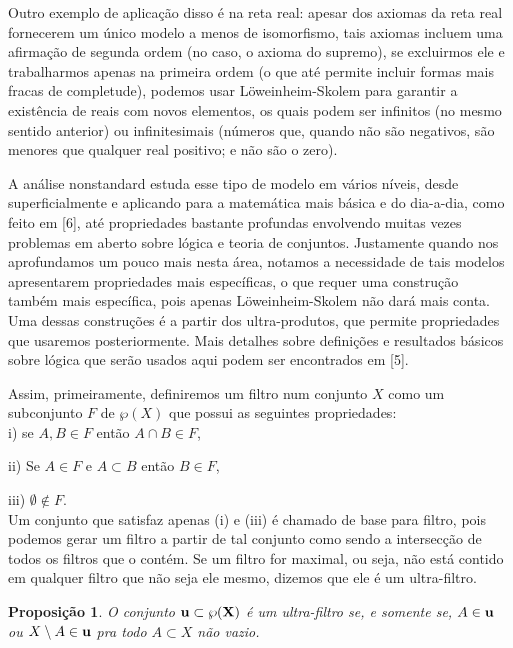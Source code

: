 \documentclass[12pt,a4paper]{article}
\newtheorem{prop}[mydef]{Proposição}
\theoremstyle{definition}
\begin{document}
Outro exemplo de aplicação disso é na reta real: apesar dos axiomas da reta real fornecerem um único modelo a menos de isomorfismo, tais axiomas incluem uma afirmação de segunda ordem (no caso, o axioma do supremo), se excluirmos ele e trabalharmos apenas na primeira ordem (o que até permite incluir formas mais fracas de completude), podemos usar Löweinheim-Skolem para garantir a existência de reais com novos elementos, os quais podem ser infinitos (no mesmo sentido anterior) ou infinitesimais (números que, quando não são negativos, são menores que qualquer real positivo; e não são o zero).

A análise nonstandard estuda esse tipo de modelo em vários níveis, desde superficialmente e aplicando para a matemática mais básica e do dia-a-dia, como feito em [6], até propriedades bastante profundas envolvendo muitas vezes problemas em aberto sobre lógica e teoria de conjuntos. Justamente quando nos aprofundamos um pouco mais nesta área, notamos a necessidade de tais modelos apresentarem propriedades mais específicas, o que requer uma construção também mais específica, pois apenas Löweinheim-Skolem não dará mais conta. Uma dessas construções é a partir dos ultra-produtos, que permite propriedades que usaremos posteriormente. Mais detalhes sobre definições e resultados básicos sobre lógica que serão usados aqui podem ser encontrados em [5].

Assim, primeiramente, definiremos um filtro num conjunto $X$ como um subconjunto $F$ de $\wp (X)$ que possui as seguintes propriedades: \\
	
	i) se $A,B\in F$ então $A\cap B\in F$,
	
	ii) Se $A\in F$ e $A\subset B$ então $B\in F$,
	
	iii) $\emptyset \notin F$. \\

Um conjunto que satisfaz apenas (i) e (iii) é chamado de base para filtro, pois podemos gerar um filtro a partir de tal conjunto como sendo a intersecção de todos os filtros que o contém. Se um filtro for maximal, ou seja, não está contido em qualquer filtro que não seja ele mesmo, dizemos que ele é um ultra-filtro. 

\begin{prop}
	
	O conjunto $\bf{u}\subset \wp(X)$ é um ultra-filtro se, e somente se, $A\in \bf{u}$ ou $X\setminus A \in \bf{u}$ pra todo $A\subset X$ não vazio.
	
\end{prop}
\end{document}
